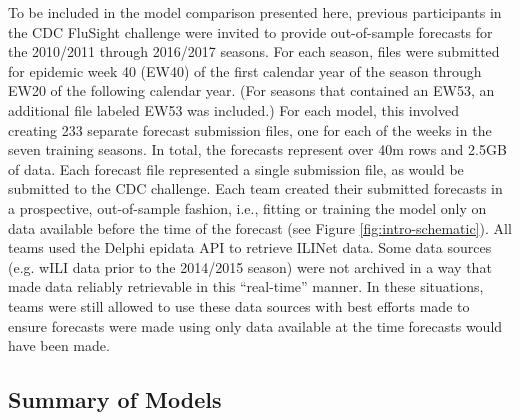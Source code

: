 \documentclass[9pt,twocolumn,twoside]{pnas-new}\usepackage[]{graphicx}\usepackage[]{color}
\begin{document}
{To be included in the model comparison presented here, previous participants in the CDC FluSight challenge were invited to provide out-of-sample forecasts for the 2010/2011 through 2016/2017 seasons.
For each season, files were submitted for epidemic week 40 (EW40) of the first calendar year of the season through EW20 of the following calendar year. 
(For seasons that contained an EW53, an additional file labeled EW53 was included.)
For each model, this involved creating 233 separate forecast submission files, one for each of the weeks in the seven training seasons.
In total, the forecasts represent over 40m rows and 2.5GB of data.
Each forecast file represented a single submission file, as would be submitted to the CDC challenge. 
Each team created their submitted forecasts in a prospective, out-of-sample fashion, i.e., fitting or training the model only on data available before the time of the forecast (see Figure \ref{fig:intro-schematic}). 
All teams used the Delphi epidata API to retrieve ILINet data.\cite{DELPHI}
Some data sources (e.g. wILI data prior to the 2014/2015 season) were not archived in a way that made data reliably retrievable in this ``real-time'' manner. 
In these situations, teams were still allowed to use these data sources with best efforts made to ensure forecasts were made using only data available at the time forecasts would have been made.

\subsection*{Summary of Models}

}
\end{document}
